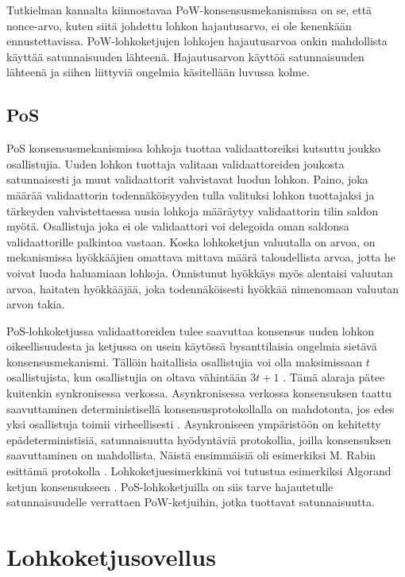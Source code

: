 Tutkielman kannalta kiinnostavaa PoW-konsensusmekanismissa on se, että nonce-arvo, kuten siitä johdettu lohkon hajautusarvo, ei ole kenenkään ennustettavissa. PoW-lohkoketjujen lohkojen hajautusarvoa onkin mahdollista käyttää satunnaisuuden lähteenä. Hajautusarvon käyttöä satunnaisuuden lähteenä ja siihen liittyviä ongelmia käsitellään luvussa kolme.

\subsection{PoS}

PoS konsensusmekanismissa lohkoja tuottaa validaattoreiksi kutsuttu joukko osallistujia. Uuden lohkon tuottaja valitaan validaattoreiden joukosta satunnaisesti ja muut validaattorit vahvistavat luodun lohkon. Paino, joka määrää validaattorin todennäköisyyden tulla valituksi lohkon tuottajaksi ja tärkeyden vahvistettaessa uusia lohkoja määräytyy validaattorin tilin saldon myötä. Osallistuja joka ei ole validaattori voi delegoida oman saldonsa validaattorille palkintoa vastaan. Koska lohkoketjun valuutalla on arvoa, on mekanismissa hyökkääjien omattava mittava määrä taloudellista arvoa, jotta he voivat luoda haluamiaan lohkoja. Onnistunut hyökkäys myös alentaisi valuutan arvoa, haitaten hyökkääjää, joka todennäköisesti hyökkää nimenomaan valuutan arvon takia.

PoS-lohkoketjussa validaattoreiden tulee saavuttaa konsensus uuden lohkon oikeellisuudesta ja ketjussa on usein käytössä bysanttilaisia ongelmia sietävä konsensusmekanismi. Tällöin haitallisia osallistujia voi olla maksimissaan $t$ osallistujista, kun osallistujia on oltava vähintään $3t + 1$ \cite{10.1145/322186.322188}. Tämä alaraja pätee kuitenkin synkronisessa verkossa. Asynkronisessa verkossa konsensuksen taattu saavuttaminen deterministisellä konsensusprotokollalla on mahdotonta, jos edes yksi osallistuja toimii virheellisesti \cite{fischer_impossibility_1985}. Asynkroniseen ympäristöön on kehitetty epädeterministisiä, satunnaisuutta hyödyntäviä protokollia, joilla konsensuksen saavuttaminen on mahdollista. Näistä ensimmäisiä oli esimerkiksi M. Rabin esittämä protokolla \cite{10.1109/SFCS.1983.48}. Lohkoketjuesimerkkinä voi tutustua esimerkiksi Algorand ketjun konsensukseen \cite{gilad_algorand_2017}. PoS-lohkoketjuilla on siis tarve hajautetulle satunnaisuudelle verrattaen PoW-ketjuihin, jotka tuottavat satunnaisuutta.

\section{Lohkoketjusovellus}

